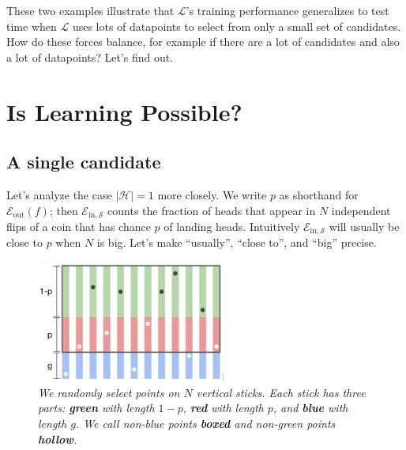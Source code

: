 \documentclass[openany, notitlepage, justified]{tufte-book}
\newcommand{\Ee}{\mathcal{E}}
\newcommand{\Hh}{\mathcal{H}}
\newcommand{\Ll}{\mathcal{L}}
\newcommand{\Ss}{\mathcal{S}}
\newcommand{\Ein}{\Ee_{\text{in},\Ss}}
\newcommand{\Eout}{\Ee_{\text{out}}}
\begin{document}
            These two examples illustrate that $\Ll$'s training performance
            generalizes to test time when $\Ll$ uses lots of datapoints to
            select from only a small set of candidates.  
            How do these forces balance, for example if there are a lot of
            candidates and also a lot of datapoints?  Let's find out.

            \newpage
    \chapter{Is Learning Possible?}
        \section{A single candidate}
            Let's analyze the case $|\Hh|=1$ more closely.  We write $p$ as
            shorthand for $\Eout(f)$; then $\Ein$
            counts the fraction of heads that appear in $N$ independent flips
            of a coin that has chance $p$ of landing heads.  Intuitively
            $\Ein$ will usually be close to $p$ when $N$ is big.
            Let's make ``usually'', ``close to'', and ``big''  precise.

            \begin{figure}[h!]
                \centering
                \includegraphics[height=4cm]{chernoff}
                \caption{\emph{
                    We randomly select points on $N$ vertical sticks.  Each
                    stick has three parts: \textbf{green} with length $1-p$,
                    \textbf{red} with length $p$, and \textbf{blue} with length
                    $g$.  We call non-blue points \textbf{boxed} and non-green
                    points \textbf{hollow}.
                }}
            \end{figure}
\end{document}
